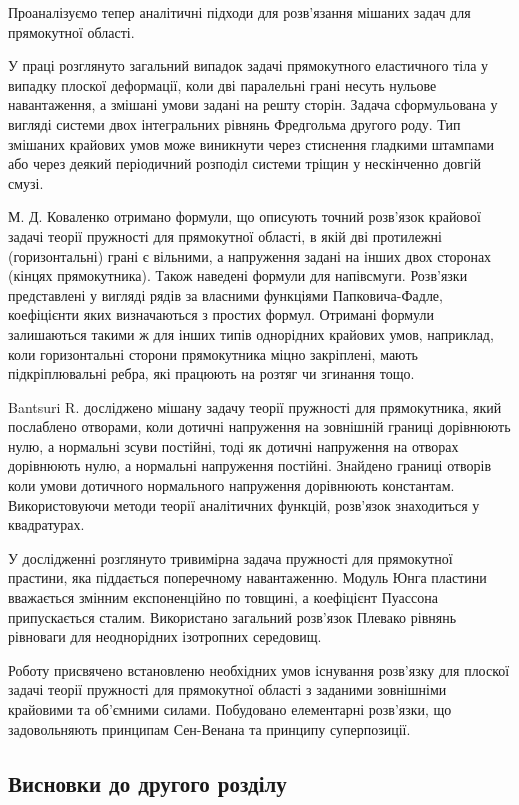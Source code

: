 Проаналізуємо тепер аналітичні підходи для розв'язання мішаних задач для прямокутної області.

У праці \cite{shyam_1} розглянуто загальний випадок задачі прямокутного еластичного тіла у випадку плоскої деформації,
коли дві паралельні грані несуть нульове навантаження, а змішані умови задані на решту сторін.
Задача сформульована у вигляді системи двох інтегральних рівнянь Фредгольма другого роду.
Тип змішаних крайових умов може виникнути через стиснення гладкими штампами або через деякий періодичний розподіл системи тріщин у нескінченно довгій смузі.

М. Д. Коваленко \cite{kovalenko_1} отримано формули, що описують точний розв'язок крайової задачі теорії пружності для прямокутної області,
в якій дві протилежні (горизонтальні) грані є вільними, а напруження задані на інших двох сторонах (кінцях прямокутника).
Також наведені формули для напівсмуги. Розв'язки представлені у вигляді рядів за власними функціями Папковича-Фадле, коефіцієнти яких визначаються з простих формул.
Отримані формули залишаються такими ж для інших типів однорідних крайових умов, наприклад,
коли горизонтальні сторони прямокутника міцно закріплені, мають підкріплювальні ребра, які працюють на розтяг чи згинання тощо.

Bantsuri R. \cite{bantsuri_1} досліджено мішану задачу теорії пружності для прямокутника, який послаблено отворами,
коли дотичні напруження на зовнішній границі дорівнюють нулю, а нормальні зсуви постійні,
тоді як дотичні напруження на отворах дорівнюють нулю, а нормальні напруження постійні.
Знайдено границі отворів коли умови дотичного нормального напруження дорівнюють константам.
Використовуючи методи теорії аналітичних функцій, розв'язок знаходиться у квадратурах.

У дослідженні \cite{kashtalyan_1} розглянуто тривимірна задача пружності для прямокутної прастини,
яка піддається поперечному навантаженню.
Модуль Юнга пластини вважається змінним експоненційно по товщині, а коефіцієнт Пуассона припускається сталим.
Використано загальний розв'язок Плевако рівнянь рівноваги для неоднорідних ізотропних середовищ.

Роботу \cite{vihak_2} присвячено встановленю необхідних умов існування розв'язку для плоскої задачі теорії пружності для прямокутної області
з заданими зовнішніми крайовими та об'ємними силами.
Побудовано елементарні розв'язки, що задовольняють принципам Сен-Венана та принципу суперпозиції.

\subsection{Висновки до другого розділу}

